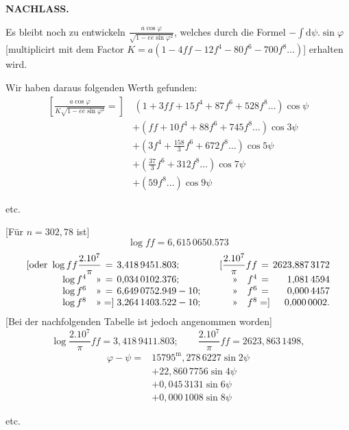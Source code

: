 \par\clearpage
{}\hfill{\small\textbf{NACHLASS.}}\hfill\null\par\medskip
Es bleibt noch zu entwickeln \(\frac{a\cos\varphi}{\sqrt{1-ee\sin\varphi^2}}\), welches durch die Formel \(-\int\mathrm{d}\psi.\sin\varphi\) [multiplicirt mit dem Factor \(K=a(1-4ff-12f^4-80f^6-700f^8\ldots)\)] erhalten wird.

Wir haben daraus folgenden Werth gefunden:
\[
\begin{aligned}
\left[\frac{a\cos\varphi}{K\sqrt{1-ee\sin\varphi^2}}={}\right]
&\,(1+3ff+15f^4+87f^6+528f^8\ldots)\cos\psi\\
&+(ff+10f^4+88f^6+745f^8\ldots)\cos3\psi\\
&+\left(3f^4+\frac{158}{3}f^6+672f^8\ldots\right)\cos5\psi\\
&+\left(\frac{37}{3}f^6+312f^8\ldots\right)\cos7\psi\\
&+(59f^8\ldots)\cos9\psi
\end{aligned}
\]
{\centering etc.\par}
\bigskip
{\centering [28.]\par}
[Für \(n=302{,}78\) ist]
\[
\log ff=6{,}615\,0650.573
\]
\[
\begin{array}{@{}r@{\;}c@{\;}l@{\qquad}r@{\;}c@{\;}r@{}}
[\text{oder }\log ff\dfrac{2.10^7}{\pi}&=&3{,}418\,9451.803;&[\dfrac{2.10^7}{\pi}ff&=&2623{,}887\,3172\\[3pt]
\log f^4\quad\text{»}&=&0{,}034\,0102.376;&\text{»}\quad f^4&=&1{,}081\,4594\\
\log f^6\quad\text{»}&=&6{,}649\,0752.949-10;&\text{»}\quad f^6&=&0{,}000\,4457\\
\log f^8\quad\text{»}&=]&3{,}264\,1403.522-10;&\text{»}\quad f^8&=]&0{,}000\,0002.
\end{array}
\]
[Bei der nachfolgenden Tabelle ist jedoch angenommen worden]
\[
\log\frac{2.10^7}{\pi}ff=3{,}418\,9411.803;\qquad
\frac{2.10^7}{\pi}ff=2623{,}863\,1498,
\]
\noindent [dem \(n=302{,}7827\ldots\) entsprechen würde. Auf Grund dieses Werthes von \(ff\) ergeben sich zwischen \(\psi,\varphi\) und \(\omega\) die folgenden Beziehungen, wenn diese Grössen in Metern, also in \(10\,000\,000.\) Theilen des Quadranten gemessen werden:]
\[
\begin{aligned}
\varphi-\psi={}&15795^{\mathrm{m}}{,}278\,6227\sin2\psi\\
&+22{,}860\,7756\sin4\psi\\
&+0{,}045\,3131\sin6\psi\\
&+0{,}000\,1008\sin8\psi
\end{aligned}
\]
{\centering etc.\par}

